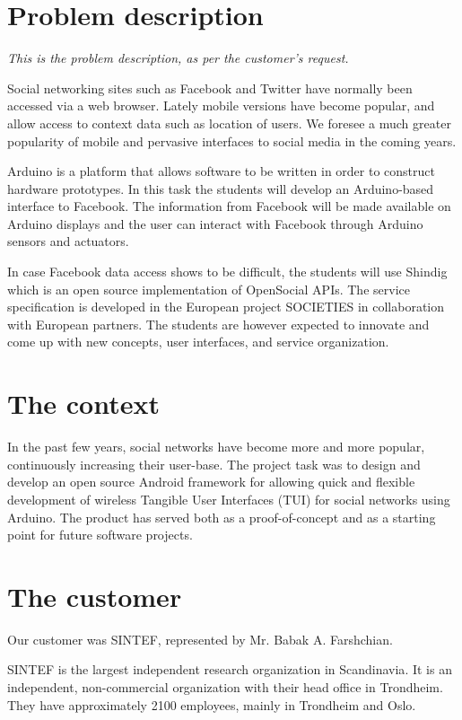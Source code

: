 \section{Problem description}

\emph{This is the problem description, as per the customer's request.}

Social networking sites such as Facebook\cite{link:facebook} and Twitter\cite{link:twitter}
have normally been accessed  via a web browser. Lately mobile versions have become popular,
and allow access to context data such as location of users. We foresee a much greater popularity
of mobile and pervasive interfaces to social media in the coming years.

Arduino\cite{link:arduino} is a platform that allows software to be written in order to construct
hardware prototypes. In this task the students will develop an Arduino-based interface to Facebook.
The information from Facebook will be made available on Arduino displays and the user can interact
with Facebook through Arduino sensors and actuators.

In case Facebook data access shows to be difficult, the students will use Shindig\cite{link:shinding} which 
is an open source implementation of OpenSocial\cite{link:opensocial} APIs. The service specification is developed
in the European project SOCIETIES in collaboration with European partners. The students are however expected to
innovate and come up with new concepts, user interfaces, and service organization.

\section{The context}
In the past few years, social networks have become more and more popular, continuously increasing their user-base.
The project task was to design and develop an open source Android\cite{link:android} framework for allowing quick
and flexible development of wireless Tangible User Interfaces (TUI) for social networks using Arduino.
The product has served both as a proof-of-concept and as a starting point for future software projects.

\section{The customer}
Our customer was SINTEF, represented by Mr. Babak A. Farshchian.

SINTEF is the largest independent research organization in Scandinavia\cite{link:sintef}.
It is an independent, non-commercial organization with their head office in Trondheim.
They have approximately 2100 employees, mainly in Trondheim and Oslo.

